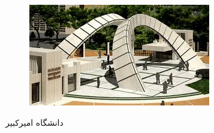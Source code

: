 \begin{figure}[h!]
\begin{subfigure}{0.33\textwidth}
			\caption{}
			\label{f62}
		\end{subfigure}\hfil %
        \begin{subfigure}{0.33\textwidth}
			\includegraphics[width=\linewidth]{Images/Chapter6/test3.jpg}
			\caption{}
			\label{f63}
        \end{subfigure}
		\caption{دانشگاه امیرکبیر}
		\label{fig:fig1}
\end{figure}
